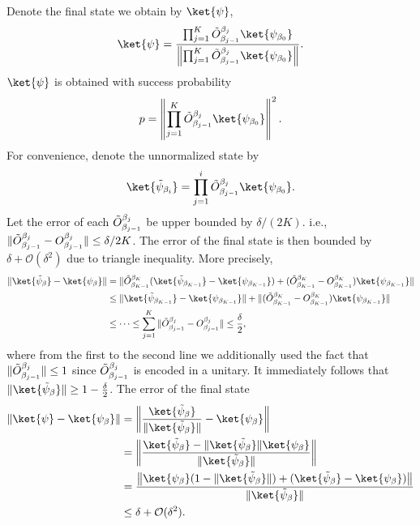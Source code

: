 \documentclass{article}
\theoremstyle{plain}
\theoremstyle{plain}
\theoremstyle{plain}
\theoremstyle{plain}
\theoremstyle{plain}
\theoremstyle{plain}
\theoremstyle{plain}
\newcommand{\norm}[1]{\lVert #1 \rVert}
\newcommand{\calO}{\ensuremath{\mathcal{O}}}
\begin{document}
Denote the final state we obtain by $\ket{\psi}$,
\begin{equation}
    \label{eq:finalstate}
    \ket{\psi} = \frac{\prod_{j=1}^K \Tilde{O}_{\beta_{j-1}}^{\beta_{j}} \ket{\psi_{\beta_0}}}{\left\|\prod_{j=1}^K \Tilde{O}_{\beta_{j-1}}^{\beta_{j}} \ket{\psi_{\beta_0}} \right\|}.
\end{equation} 
$\ket{\psi}$ is obtained with success probability
\begin{equation}
    \label{eq:successprob}
    p = \left\|\prod_{j=1}^K \Tilde{O}_{\beta_{j-1}}^{\beta_{j}} \ket{\psi_{\beta_0}}\right\|^2.
\end{equation}
For convenience, denote the unnormalized state by
\begin{equation}
    \ket{\Tilde{\psi}_{\beta_i}} =  \prod_{j=1}^{i} \Tilde{O}_{\beta_{j-1}}^{\beta_{j}} \ket{\psi_{\beta_0}}.
\end{equation}
Let the error of each $\Tilde{O}_{\beta_{j-1}}^{\beta_{j}}$ be upper bounded by $\delta/(2K)$. i.e., $\|\Tilde{O}_{\beta_{j-1}}^{\beta_{j}} - O_{\beta_{j-1}}^{\beta_{j}}\| \le \delta/{2K}$. 
The error of the final state is then bounded by $\delta + \calO(\delta^2)$ due to triangle inequality. More precisely,
\begin{equation}
    \begin{aligned}
    \| \ket{\Tilde{\psi}_\beta} - \ket{\psi_\beta} \| & = \norm{ \Tilde{O}_{\beta_{K-1}}^{\beta_{K}} (\ket{\Tilde{\psi}_{\beta_{K-1}}} - \ket{\psi_{\beta_{K-1}}}) + (\Tilde{O}_{\beta_{K-1}}^{\beta_{K}} - {O}_{\beta_{K-1}}^{\beta_{K}}) \ket{\psi_{\beta_{K-1}}} } \\
    & \le \norm{\ket{\Tilde{\psi}_{\beta_{K-1}}} - \ket{\psi_{\beta_{K-1}}}} + \norm{(\Tilde{O}_{\beta_{K-1}}^{\beta_{K}} - {O}_{\beta_{K-1}}^{\beta_{K}}) \ket{\psi_{\beta_{K-1}}}} \\ 
    & \le \cdots \le \sum_{j=1}^{K} \| \Tilde{O}_{\beta_{j-1}}^{\beta_{j}} - {O}_{\beta_{j-1}}^{\beta_{j}} \| \le \frac{\delta}{2},
    \end{aligned}
\end{equation} where from the first to the second line we additionally used the fact that $\|\Tilde{O}_{\beta_{j-1}}^{\beta_{j}}\|\le 1$ since $\Tilde{O}_{\beta_{j-1}}^{\beta_{j}}$ is encoded in a unitary. It immediately follows that $\| \ket{\Tilde{\psi}_\beta} \| \ge 1 - \frac{\delta}{2}$. 
The error of the final state
\begin{equation}
    \begin{aligned}
        \| \ket{\psi} - \ket{\psi_\beta}\| & = \left\| \frac{   \ket{\Tilde{\psi}_\beta}  }{  \|\ket{\Tilde{\psi}_\beta}\|  } - \ket{\psi_\beta}  \right\| \\ 
        & = \left\| \frac{ \ket{\Tilde{\psi}_\beta} - \|\ket{\Tilde{\psi}_\beta}\| \ket{\psi_{\beta}}  }{  \|\ket{\Tilde{\psi}_\beta}\|  } \right\| \\ 
        & = \frac{ \left\| \ket{\psi_\beta} ( 1 - \| \ket{\Tilde{\psi}_\beta} \|) + ( \ket{\Tilde{\psi}_\beta} - \ket{\psi_\beta} )\right\| }{  \|\ket{\Tilde{\psi}_\beta}\|  } \\ 
        & \le \delta + \calO(\delta^2).
    \end{aligned}
\end{equation}
\end{document}
